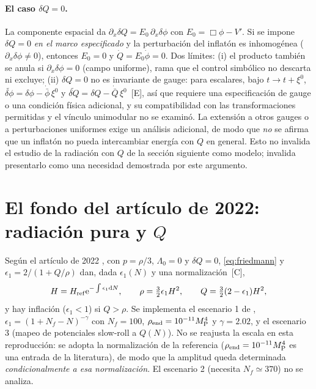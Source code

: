 \documentclass[11pt,a4paper]{article}
\numberwithin{equation}{section}
\newcommand{\MP}{M_{\rm P}}\newcommand{\kap}{\kappa}\newcommand{\Lb}{\bar\lambda}\newcommand{\dd}{\mathrm d}\newcommand{\ee}{\mathrm e}
\newcommand{\etq}[1]{\,{\footnotesize\color{gray}[#1]}}
\begin{document}
\paragraph{El caso $\delta Q=0$.} La componente espacial da $\partial_x\delta Q=E_0\,\partial_x\delta\phi$ con $E_0=\Box\phi-V'$. Si se impone $\delta Q=0$ \emph{en el marco especificado} y la perturbaci\'on del inflat\'on es inhomog\'enea ($\partial_x\delta\phi\neq0$), entonces $E_0=0$ y $\dot Q=E_0\dot\phi=0$. Dos l\'imites: (i) el producto tambi\'en se anula si $\partial_x\delta\phi=0$ (campo uniforme), rama que el control simb\'olico no descarta ni excluye; (ii) $\delta Q=0$ no es invariante de gauge: para escalares, bajo $t\to t+\xi^0$, $\widetilde{\delta\phi}=\delta\phi-\dot{\bar\phi}\,\xi^0$ y $\widetilde{\delta Q}=\delta Q-\dot{\bar Q}\,\xi^0$ \etq{E}, as\'i que requiere una especificaci\'on de gauge o una condici\'on f\'isica adicional, y su compatibilidad con las transformaciones permitidas y el v\'inculo unimodular no se examin\'o. La extensi\'on a otros gauges o a perturbaciones uniformes exige un an\'alisis adicional, de modo que \emph{no} se afirma que un inflat\'on no pueda intercambiar energ\'ia con $Q$ en general. Esto no invalida el estudio de la radiaci\'on con $Q$ de la secci\'on siguiente como modelo; invalida presentarlo como una necesidad demostrada por este argumento.

\section{El fondo del art\'iculo de 2022: radiaci\'on pura y $Q$ \cite{leon22}}
\label{sec:leon}
Seg\'un el art\'iculo de 2022 \cite{leon22}, con $p=\rho/3$, $\Lambda_0=0$ y $\delta Q=0$, \eqref{eq:friedmann} y $\epsilon_1=2/(1+Q/\rho)$ dan, dada $\epsilon_1(N)$ y una normalizaci\'on \etq{C},
\begin{equation}
H=H_{\rm ref}\ee^{-\int\epsilon_1\dd N},\qquad \rho=\tfrac32\epsilon_1H^2,\qquad Q=\tfrac32(2-\epsilon_1)H^2,
\label{eq:leon}
\end{equation}
y hay inflaci\'on ($\epsilon_1<1$) si $Q>\rho$. Se implementa el escenario 1 de \cite{piccirilli23}, $\epsilon_1=(1+N_f-N)^{-\gamma}$ con $N_f=100$, $\rho_{\rm end}=10^{-11}\MP^4$ y $\gamma=2.02$, y el escenario 3 (mapeo de potenciales slow-roll a $Q(N)$). No se reajusta la escala en esta reproducci\'on: se adopta la normalizaci\'on de la referencia ($\rho_{\rm end}=10^{-11}\MP^4$ es una entrada de la literatura), de modo que la amplitud queda determinada \emph{condicionalmente a esa normalizaci\'on}. El escenario 2 (necesita $N_f\simeq370$) no se analiza.
\end{document}
